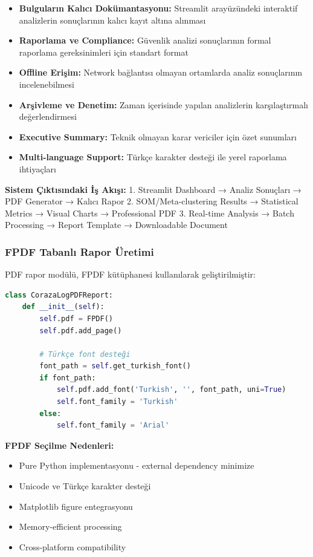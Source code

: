 \begin{itemize}
    \item \textbf{Bulguların Kalıcı Dokümantasyonu:} Streamlit arayüzündeki interaktif analizlerin sonuçlarının kalıcı kayıt altına alınması
    \item \textbf{Raporlama ve Compliance:} Güvenlik analizi sonuçlarının formal raporlama gereksinimleri için standart format
    \item \textbf{Offline Erişim:} Network bağlantısı olmayan ortamlarda analiz sonuçlarının incelenebilmesi
    \item \textbf{Arşivleme ve Denetim:} Zaman içerisinde yapılan analizlerin karşılaştırmalı değerlendirmesi
    \item \textbf{Executive Summary:} Teknik olmayan karar vericiler için özet sunumları
    \item \textbf{Multi-language Support:} Türkçe karakter desteği ile yerel raporlama ihtiyaçları
\end{itemize}

\textbf{Sistem Çıktısındaki İş Akışı:}
1. Streamlit Dashboard → Analiz Sonuçları → PDF Generator → Kalıcı Rapor
2. SOM/Meta-clustering Results → Statistical Metrics → Visual Charts → Professional PDF
3. Real-time Analysis → Batch Processing → Report Template → Downloadable Document

\newpage

\subsubsection{FPDF Tabanlı Rapor Üretimi}

PDF rapor modülü, FPDF kütüphanesi kullanılarak geliştirilmiştir:

\begin{lstlisting}[language=python]
class CorazaLogPDFReport:
    def __init__(self):
        self.pdf = FPDF()
        self.pdf.add_page()
        
        # Türkçe font desteği
        font_path = self.get_turkish_font()
        if font_path:
            self.pdf.add_font('Turkish', '', font_path, uni=True)
            self.font_family = 'Turkish'
        else:
            self.font_family = 'Arial'
\end{lstlisting}

\textbf{FPDF Seçilme Nedenleri:}
\begin{itemize}
    \item Pure Python implementasyonu - external dependency minimize
    \item Unicode ve Türkçe karakter desteği
    \item Matplotlib figure entegrasyonu
    \item Memory-efficient processing
    \item Cross-platform compatibility
\end{itemize}

